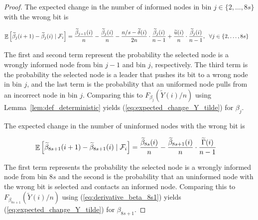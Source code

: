 \documentclass[a4paper,12pt]{article}
\DeclareMathOperator{\Ex}{\mathbb{E}}%
\begin{document}
\begin{proof}
\medskip

The expected change in the number of informed nodes in bin $j \in \{2, \ldots, 8s\}$ with the wrong bit is
\begin{small}
\begin{align}
\Ex\left[\widetilde{\beta}_j(i+1) - \widetilde{\beta}_j(i) \mid \mathcal{F}_i \right] & =
 \frac{\widetilde{\beta}_{j-1}(i)}{n} -  \frac{\widetilde{\beta}_{j}(i)}{n}- \frac{n/s - \widetilde{\delta}(i)}{2n} \cdot \frac{\widetilde{\beta}_j(i)}{n-1} + \frac{\widetilde{u}(i)}{n} \cdot \frac{\widetilde{\beta}_j(i)}{n-1}, \; \; \forall j \in\{2, \ldots, 8s\} \notag
 \end{align}
 \end{small}
 The first and second term represent the probability the selected node is a wrongly informed node from bin $j-1$ and bin $j$, respectively. The third term is the probability the selected node is a leader that pushes its bit to a wrong node in bin $j$, and the last term is the probability that an uniformed node pulls from an incorrect node in bin $j$.
 Comparing this to $F_{\beta_{j}}(\widetilde{Y}(i)/n)$ using Lemma~\ref{lem:def_deterministic} yields (\ref{eq:expected_change_Y_tilde}) for $\beta_j$.

\medskip

The expected change in the number of uninformed nodes with the wrong bit is 
\begin{small}
	\begin{align}
	\Ex\left[\widetilde{\beta}_{8s+1}(i+1) - \widetilde{\beta}_{8s+1}(i) \mid \mathcal{F}_i \right] & =
	\frac{\widetilde{\beta}_{8s}(i)}{n} -  \frac{\widetilde{\beta}_{8s+1}(i)}{n} \cdot \frac{\widetilde{\Gamma}(i)}{n-1} \notag
	\end{align}
\end{small}
The first term represents the probability the selected node is a wrongly informed node from bin $8s$ and the second is the probability that an uninformed node with the wrong bit is selected and contacts an informed node.
Comparing this to $F_{\beta_{8s+1}}(\widetilde{Y}(i)/n)$ using (\ref{eq:derivative_beta_8s1}) yields (\ref{eq:expected_change_Y_tilde}) for $\beta_{8s+1}$.

\medskip




\end{proof}
\end{document}
